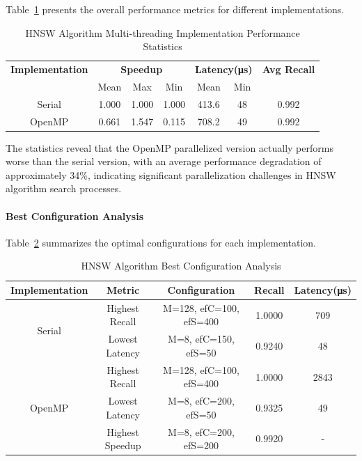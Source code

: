Table~\ref{tab:hnsw_performance_stats_en} presents the overall performance metrics for different implementations.

\begin{table}[htbp]
\centering
\caption{HNSW Algorithm Multi-threading Implementation Performance Statistics}
\label{tab:hnsw_performance_stats_en}
\begin{tabular}{|c|c|c|c|c|c|c|}
\hline
\textbf{Implementation} & \multicolumn{3}{c|}{\textbf{Speedup}} & \multicolumn{2}{c|}{\textbf{Latency(μs)}} & \textbf{Avg Recall} \\
\cline{2-6}
 & Mean & Max & Min & Mean & Min & \\
\hline
Serial & 1.000 & 1.000 & 1.000 & 413.6 & 48 & 0.992 \\
OpenMP & 0.661 & 1.547 & 0.115 & 708.2 & 49 & 0.992 \\
\hline
\end{tabular}
\end{table}

The statistics reveal that the OpenMP parallelized version actually performs worse than the serial version, with an average performance degradation of approximately 34\%, indicating significant parallelization challenges in HNSW algorithm search processes.

\paragraph{Best Configuration Analysis}

Table~\ref{tab:hnsw_best_configs_en} summarizes the optimal configurations for each implementation.

\begin{table}[htbp]
\centering
\caption{HNSW Algorithm Best Configuration Analysis}
\label{tab:hnsw_best_configs_en}
\begin{tabular}{|c|c|c|c|c|}
\hline
\textbf{Implementation} & \textbf{Metric} & \textbf{Configuration} & \textbf{Recall} & \textbf{Latency(μs)} \\
\hline
\multirow{2}{*}{Serial} & Highest Recall & M=128, efC=100, efS=400 & 1.0000 & 709 \\
& Lowest Latency & M=8, efC=150, efS=50 & 0.9240 & 48 \\
\hline
\multirow{3}{*}{OpenMP} & Highest Recall & M=128, efC=100, efS=400 & 1.0000 & 2843 \\
& Lowest Latency & M=8, efC=200, efS=50 & 0.9325 & 49 \\
& Highest Speedup & M=8, efC=200, efS=200 & 0.9920 & - \\
\hline
\end{tabular}
\end{table}

